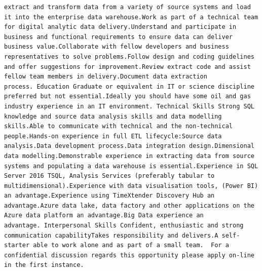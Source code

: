 \documentclass[
]{article}
\begin{document}
\begin{verbatim}
extract and transform data from a variety of source systems and load it into the enterprise data warehouse.Work as part of a technical team for digital analytic data delivery.Understand and participate in business and functional requirements to ensure data can deliver business value.Collaborate with fellow developers and business representatives to solve problems.Follow design and coding guidelines and offer suggestions for improvement.Review extract code and assist fellow team members in delivery.Document data extraction process. Education Graduate or equivalent in IT or science discipline preferred but not essential.Ideally you should have some oil and gas industry experience in an IT environment. Technical Skills Strong SQL knowledge and source data analysis skills and data modelling skills.Able to communicate with technical and the non-technical people.Hands-on experience in full ETL lifecycle:Source data analysis.Data development process.Data integration design.Dimensional data modelling.Demonstrable experience in extracting data from source systems and populating a data warehouse is essential.Experience in SQL Server 2016 TSQL, Analysis Services (preferably tabular to multidimensional).Experience with data visualisation tools, (Power BI) an advantage.Experience using TimeXtender Discovery Hub an advantage.Azure data lake, data factory and other applications on the Azure data platform an advantage.Big Data experience an advantage. Interpersonal Skills Confident, enthusiastic and strong communication capabilityTakes responsibility and delivers.A self-starter able to work alone and as part of a small team.  For a confidential discussion regards this opportunity please apply on-line in the first instance.

\end{verbatim}
\end{document}
